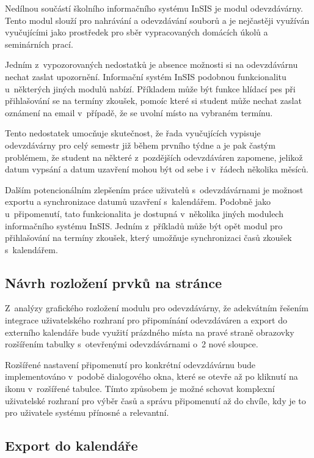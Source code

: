 Nedílnou součástí školního informačního systému InSIS je modul odevzdávárny. Tento modul slouží pro nahrávání a odevzdávání souborů a je nejčastěji využíván vyučujícími jako prostředek pro sběr vypracovaných domácích úkolů a seminárních prací. 

Jedním z~vypozorovaných nedostatků je absence možnosti si na odevzdávárnu nechat zaslat upozornění. Informační systém InSIS podobnou funkcionalitu u~některých jiných modulů nabízí. Příkladem může být funkce hlídací pes při přihlašování se na termíny zkoušek, pomoíc které si student může nechat zaslat oznámení na email v~případě, že se uvolní místo na vybraném termínu.

Tento nedostatek umocňuje skutečnost, že řada vyučujících vypisuje odevzdávárny pro celý semestr již během prvního týdne a je pak častým problémem, že student na některé z~pozdějších odevzdáváren zapomene, jelikož datum vypsání a datum uzavření mohou být od sebe i v~řádech několika měsíců.

Dalším potencionálním zlepšením práce uživatelů s~odevzdávárnami je možnost exportu a synchronizace datumů uzavření s~kalendářem. Podobně jako u~připomenutí, tato funkcionalita je dostupná v~několika jiných modulech informačního systému InSIS. Jedním z~příkladů může být opět modul pro přihlašování na termíny zkoušek, který umožňuje synchronizaci časů zkoušek s~kalendářem.

\subsection{Návrh rozložení prvků na stránce}

Z~analýzy grafického rozložení modulu pro odevzdávárny, že adekvátním řešením integrace uživatelského rozhraní pro připomínání odevzdáváren a export do externího kalendáře bude využití prázdného místa na pravé straně obrazovky rozšířením tabulky s~otevřenými odevzdávárnami o~2 nové sloupce.

Rozšířené nastavení připomenutí pro konkrétní odevzdávárnu bude implementováno v~podobě dialogového okna, které se otevře až po kliknutí na ikonu v~rozšířené tabulce. Tímto způsobem je možné schovat komplexní uživatelské rozhraní pro výběr časů a správu připomenutí až do chvíle, kdy je to pro uživatele systému přínosné a relevantní. 

\subsection{Export do kalendáře}

